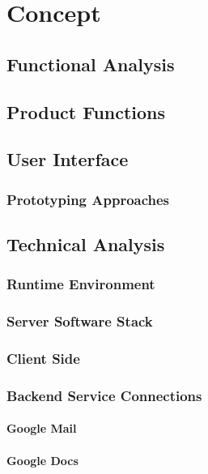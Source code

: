 \chapter{Concept}
\label{chapter:Concept}

\section{Functional Analysis}

\section{Product Functions}

\section{User Interface}

\subsection{Prototyping Approaches}

\section{Technical Analysis}

\subsection{Runtime Environment}

\subsection{Server Software Stack}

\subsection{Client Side}

\subsection{Backend Service Connections}

\subsubsection{Google Mail}

\subsubsection{Google Docs}


